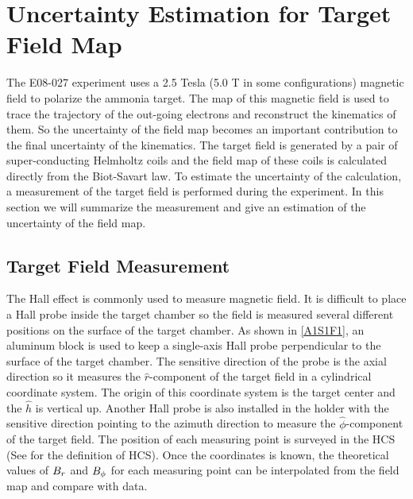 
\chapter{Uncertainty Estimation for Target Field Map}
\label{A1}

The E08-027 experiment uses a 2.5 Tesla (5.0 T in some configurations) magnetic field to polarize the ammonia target. The map of this magnetic field is used to trace the trajectory of the out-going electrons and reconstruct the kinematics of them. So the uncertainty of the field map becomes an important contribution to the final uncertainty of the kinematics. The target field is generated by a pair of super-conducting Helmholtz coils and the field map of these coils is calculated directly from the Biot-Savart law. To estimate the uncertainty of the calculation, a measurement of the target field is performed during the experiment. In this section we will summarize the measurement and give an estimation of the uncertainty of the field map.

\section{Target Field Measurement}
\label{A1S1}

The Hall effect is commonly used to measure magnetic field. It is difficult to place a Hall probe inside the target chamber so the field is measured several different positions on the surface of the target chamber. As shown in \cref{A1S1F1}, an aluminum block is used to keep a single-axis Hall probe perpendicular to the surface of the target chamber. The sensitive direction of the probe is the axial direction so it measures the $\hat{r}$-component of the target field in a cylindrical coordinate system. The origin of this coordinate system is the target center and the $\hat{h}$ is vertical up. Another Hall probe is also installed in the holder with the sensitive direction pointing to the azimuth direction to measure the $\hat{\phi}$-component of the target field. The position of each measuring point is surveyed in the HCS (See  for the definition of HCS). Once the coordinates is known, the theoretical values of $B_r$ and $B_{\phi}$ for each measuring point can be interpolated from the field map and compare with data.

